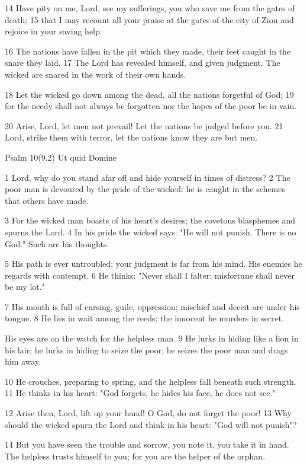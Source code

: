 14 Have pity on me, Lord, see my sufferings,
you who save me from the gates of death;
15 that I may recount all your praise
at the gates of the city of Zion
and rejoice in your saving help.

16 The nations have fallen in the pit which they made,
their feet caught in the snare they laid.
17 The Lord has revealed himself, and given judgment.
The wicked are snared in the work of their own hands.

18 Let the wicked go down among the dead,
all the nations forgetful of God;
19 for the needy shall not always be forgotten
nor the hopes of the poor be in vain.

20 Arise, Lord, let men not prevail!
Let the nations be judged before you.
21 Lord, strike them with terror,
let the nations know they are but men.


Psalm 10(9.2) Ut quid Domine

1 Lord, why do you stand afar off
and hide yourself in times of distress?
2 The poor man is devoured by the pride of the wicked:
he is caught in the schemes that others have made.

3 For the wicked man boasts of his heart's desires;
the covetous blasphemes and spurns the Lord.
4 In his pride the wicked says: "He will not punish.
There is no God." Such are his thoughts.

5 His path is ever untroubled;
your judgment is far from his mind.
His enemies he regards with contempt.
6 He thinks: "Never shall I falter:
misfortune shall never be my lot."

7 His mouth is full of cursing, guile, oppression;
mischief and deceit are under his tongue.
8 He lies in wait among the reeds;
the innocent he murders in secret.

His eyes are on the watch for the helpless man.
9 He lurks in hiding like a lion in his lair;
he lurks in hiding to seize the poor;
he seizes the poor man and drags him away.

10 He crouches, preparing to spring,
and the helpless fall beneath such strength.
11 He thinks in his heart: "God forgets,
he hides his face, he does not see."

12 Arise then, Lord, lift up your hand!
O God, do not forget the poor!
13 Why should the wicked spurn the Lord
and think in his heart: "God will not punish"?

14 But you have seen the trouble and sorrow,
you note it, you take it in hand.
The helpless trusts himself to you;
for you are the helper of the orphan.

